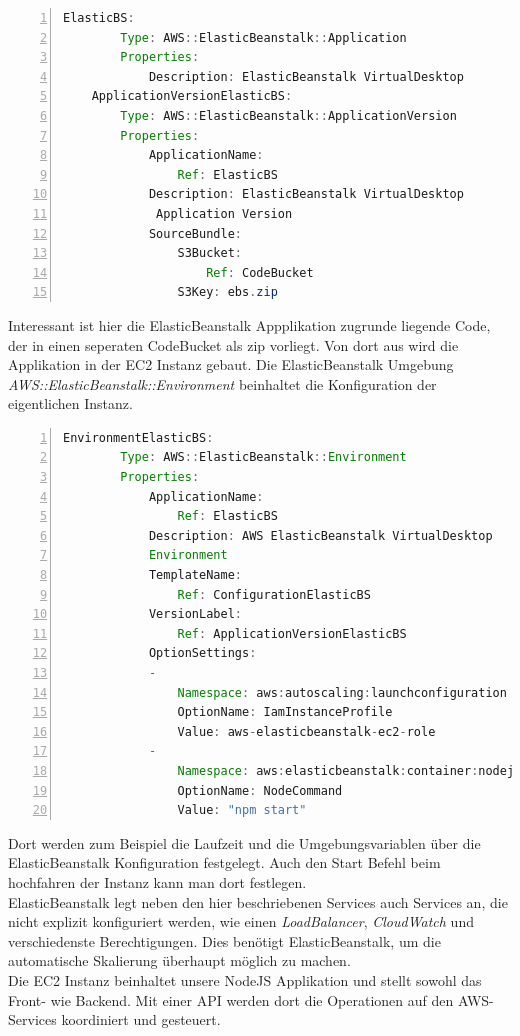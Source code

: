 \documentclass[a4paper, 12pt]{scrreprt}
\renewcommand\_{\textunderscore\allowbreak}
\begin{document}
\begin{lstlisting}[xleftmargin=\parindent,numbers=left,numberstyle=\small,numbersep=8pt,frame=L,mathescape=true, basicstyle=\small, language=Java, lineskip={1.0pt}]
ElasticBS:
        Type: AWS::ElasticBeanstalk::Application
        Properties:
            Description: ElasticBeanstalk VirtualDesktop
    ApplicationVersionElasticBS:
        Type: AWS::ElasticBeanstalk::ApplicationVersion
        Properties:
            ApplicationName:
                Ref: ElasticBS
            Description: ElasticBeanstalk VirtualDesktop
             Application Version
            SourceBundle:
                S3Bucket:
                    Ref: CodeBucket
                S3Key: ebs.zip
\end{lstlisting}
Interessant ist hier die ElasticBeanstalk Appplikation zugrunde liegende Code, der in einen seperaten CodeBucket als zip vorliegt. Von dort aus wird die Applikation in der EC2 Instanz gebaut.
Die ElasticBeanstalk Umgebung
 \textit{AWS::ElasticBeanstalk::Environment} beinhaltet die Konfiguration der eigentlichen Instanz.
\begin{lstlisting}[xleftmargin=\parindent,numbers=left,numberstyle=\small,numbersep=8pt,frame=L,mathescape=true, basicstyle=\small, language=Java, lineskip={1.0pt}]
    EnvironmentElasticBS:
        Type: AWS::ElasticBeanstalk::Environment
        Properties:
            ApplicationName:
                Ref: ElasticBS
            Description: AWS ElasticBeanstalk VirtualDesktop 
            Environment
            TemplateName:
                Ref: ConfigurationElasticBS
            VersionLabel:
                Ref: ApplicationVersionElasticBS
            OptionSettings:
            -
                Namespace: aws:autoscaling:launchconfiguration 
                OptionName: IamInstanceProfile
                Value: aws-elasticbeanstalk-ec2-role
            -
                Namespace: aws:elasticbeanstalk:container:nodejs
                OptionName: NodeCommand
                Value: "npm start"
\end{lstlisting}

Dort werden zum Beispiel die Laufzeit und die Umgebungsvariablen über die ElasticBeanstalk Konfiguration festgelegt. Auch den Start Befehl beim hochfahren der Instanz kann man dort festlegen.\\
ElasticBeanstalk legt neben den hier beschriebenen Services auch Services an, die nicht explizit konfiguriert werden, wie einen \textit{LoadBalancer}, \textit{CloudWatch} und verschiedenste Berechtigungen. Dies benötigt ElasticBeanstalk, um die automatische Skalierung überhaupt möglich zu machen. \\
Die EC2 Instanz beinhaltet unsere NodeJS Applikation und stellt sowohl das Front- wie Backend. Mit einer API werden dort die Operationen auf den AWS-Services koordiniert und gesteuert. 
\end{document}

